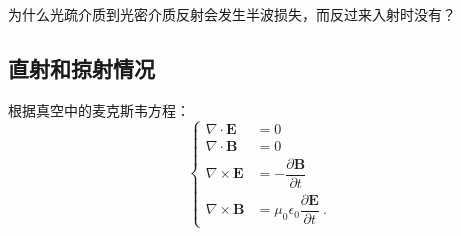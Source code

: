 
为什么光疏介质到光密介质反射会发生半波损失，而反过来入射时没有？

\subsection{直射和掠射情况}
根据真空中的麦克斯韦方程：
\begin{equation}
\begin{cases}
\nabla\cdot \boldsymbol{E}&=0\\
\nabla\cdot \boldsymbol{B}&=0\\
\nabla\times  \boldsymbol{E}&=-\dfrac{\partial \boldsymbol{B}}{\partial t} \\
\nabla\times  \boldsymbol{B}&=\mu_0\epsilon_0\dfrac{\partial \boldsymbol{E}}{\partial t}~.
\end{cases}
\end{equation}